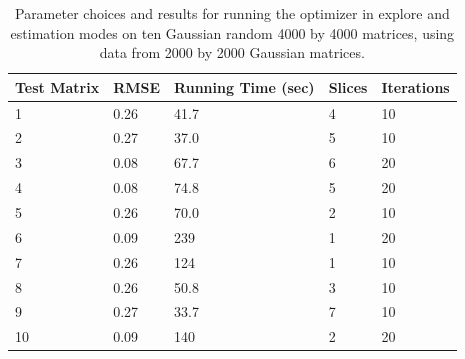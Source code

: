 \begin{table}
\label{fig:4kAdaptiveTable}
\begin{center}
    \begin{tabular}{| p{2.2cm} | p{2.2cm} | p{2.2cm} | p{2.2cm} | p{2.2cm} |}
    \hline
    Test Matrix & RMSE & Running Time (sec) & Slices & Iterations \\ \hline
    1 & 0.26 & 41.7 & 4 & 10 \\ \hline
    2 & 0.27 & 37.0 & 5 & 10 \\ \hline
    3 & 0.08 & 67.7 & 6 & 20 \\ \hline
    4 & 0.08 & 74.8 & 5 & 20 \\ \hline
    5 & 0.26 & 70.0 & 2 & 10 \\ \hline
    6 & 0.09 & 239 & 1 & 20 \\ \hline
    7 & 0.26 & 124 & 1 & 10 \\ \hline
    8 & 0.26 & 50.8 & 3 & 10 \\ \hline
    9 & 0.27 & 33.7 & 7 & 10 \\ \hline
    10 & 0.09 & 140 & 2 & 20 \\ \hline
    \end{tabular}
\end{center}
\caption{Parameter choices and results for running the optimizer in explore and estimation modes on ten Gaussian random 4000 by 4000 matrices, using
data from 2000 by 2000 Gaussian matrices.}
\end{table}
